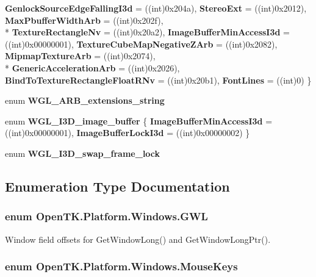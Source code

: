 \begin{DoxyCompactItemize}
{\bfseries Genlock\-Source\-Edge\-Falling\-I3d} = ((int)0x204a), 
{\bfseries Stereo\-Ext} = ((int)0x2012), 
{\bfseries Max\-Pbuffer\-Width\-Arb} = ((int)0x202f), 
\\*
{\bfseries Texture\-Rectangle\-Nv} = ((int)0x20a2), 
{\bfseries Image\-Buffer\-Min\-Access\-I3d} = ((int)0x00000001), 
{\bfseries Texture\-Cube\-Map\-Negative\-Z\-Arb} = ((int)0x2082), 
{\bfseries Mipmap\-Texture\-Arb} = ((int)0x2074), 
\\*
{\bfseries Generic\-Acceleration\-Arb} = ((int)0x2026), 
{\bfseries Bind\-To\-Texture\-Rectangle\-Float\-R\-Nv} = ((int)0x20b1), 
{\bfseries Font\-Lines} = ((int)0)
 \}
\item 
enum {\bfseries W\-G\-L\-\_\-\-A\-R\-B\-\_\-extensions\-\_\-string} 
\item 
enum {\bfseries W\-G\-L\-\_\-\-I3\-D\-\_\-image\-\_\-buffer} \{ {\bfseries Image\-Buffer\-Min\-Access\-I3d} = ((int)0x00000001), 
{\bfseries Image\-Buffer\-Lock\-I3d} = ((int)0x00000002)
 \}
\item 
enum {\bfseries W\-G\-L\-\_\-\-I3\-D\-\_\-swap\-\_\-frame\-\_\-lock} 
\end{DoxyCompactItemize}


\subsection{Enumeration Type Documentation}
\hypertarget{namespace_open_t_k_1_1_platform_1_1_windows_aeecca222b998fe7822b34fc81826998c}{
\subsubsection[{G\-W\-L}]{\setlength{\rightskip}{0pt plus 5cm}enum {\bf Open\-T\-K.\-Platform.\-Windows.\-G\-W\-L}}}\label{namespace_open_t_k_1_1_platform_1_1_windows_aeecca222b998fe7822b34fc81826998c}


Window field offsets for Get\-Window\-Long() and Get\-Window\-Long\-Ptr(). 

\hypertarget{namespace_open_t_k_1_1_platform_1_1_windows_a781d0e922402f6417e08317522cdb030}{
\subsubsection[{Mouse\-Keys}]{\setlength{\rightskip}{0pt plus 5cm}enum {\bf Open\-T\-K.\-Platform.\-Windows.\-Mouse\-Keys}}}\label{namespace_open_t_k_1_1_platform_1_1_windows_a781d0e922402f6417e08317522cdb030}


